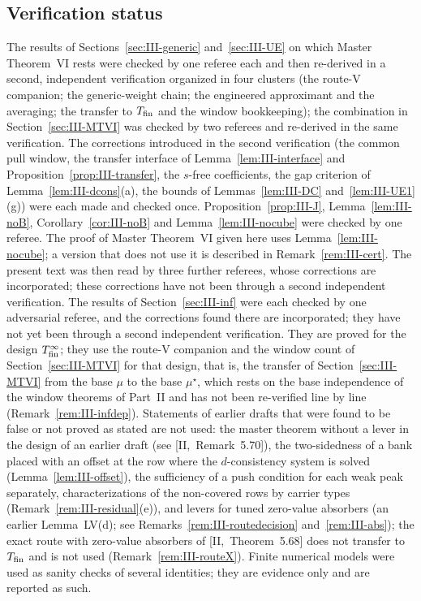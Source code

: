 \documentclass[10pt]{amsart}
\theoremstyle{definition}
\theoremstyle{remark}
\begin{document}
\subsection{Verification status}
The results of Sections~\ref{sec:III-generic} and~\ref{sec:III-UE} on which
Master Theorem~VI rests were checked by one referee each and then
re-derived in a second, independent verification organized in four
clusters (the route-V companion; the generic-weight chain; the engineered
approximant and the averaging; the transfer to $T_{\rm fin}$ and the window
bookkeeping); the combination in Section~\ref{sec:III-MTVI} was checked by
two referees and re-derived in the same verification.  The corrections
introduced in the second verification (the common pull window, the
transfer interface of Lemma~\ref{lem:III-interface} and
Proposition~\ref{prop:III-transfer}, the $s$-free coefficients, the gap
criterion of Lemma~\ref{lem:III-dcons}(a), the bounds of
Lemmas~\ref{lem:III-DC} and~\ref{lem:III-UE1}(g)) were each made and
checked once.  Proposition~\ref{prop:III-J}, Lemma~\ref{lem:III-noB},
Corollary~\ref{cor:III-noB} and Lemma~\ref{lem:III-nocube} were checked by
one referee.  The proof of Master Theorem~VI given here uses
Lemma~\ref{lem:III-nocube}; a version that does not use it is described in
Remark~\ref{rem:III-cert}.  The present text was then read by three further
referees, whose corrections are incorporated; these corrections have not
been through a second independent verification.  The results of
Section~\ref{sec:III-inf} were each checked by one adversarial referee,
and the corrections found there are incorporated; they have not yet been
through a second independent verification.  They are proved for the
design $T^\infty_{\rm fin}$; they use the route-V companion and the window
count of Section~\ref{sec:III-MTVI} for that design, that is, the transfer
of Section~\ref{sec:III-MTVI} from the base $\mu$ to the base $\mu^\star$,
which rests on the base independence of the window theorems of Part~II
and has not been re-verified line by line (Remark~\ref{rem:III-infdep}).  Statements of earlier drafts that were found to be false or not proved as
stated are not used: the master theorem without a lever in the design of
an earlier draft (see [II,~Remark~5.70]), the two-sidedness of a bank placed
with an offset at the row where the $d$-consistency system is solved
(Lemma~\ref{lem:III-offset}), the sufficiency of a push condition for each
weak peak separately, characterizations of the non-covered rows by
carrier types (Remark~\ref{rem:III-residual}(e)), and levers for tuned
zero-value absorbers (an earlier Lemma~LV(d); see
Remarks~\ref{rem:III-routedecision} and~\ref{rem:III-abs}); the exact route with
zero-value absorbers of [II,~Theorem~5.68] does not transfer to
$T_{\rm fin}$ and is not used (Remark~\ref{rem:III-routeX}).  Finite numerical
models were used as sanity checks of several identities; they are evidence
only and are reported as such.
\end{document}
